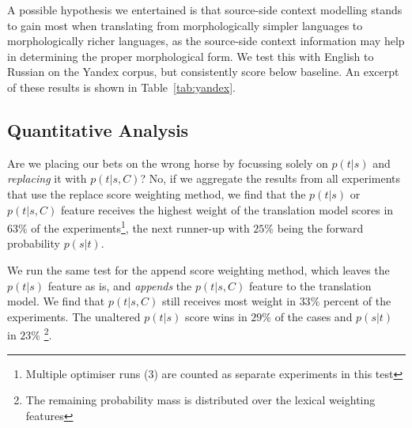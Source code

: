 A possible hypothesis we entertained is that source-side context modelling
stands to gain most when translating from morphologically simpler languages to
morphologically richer languages, as the source-side context information may
help in determining the proper morphological form. We test this with English to
Russian on the Yandex corpus, but consistently score below baseline. An excerpt
of these results is shown in Table~\ref{tab:yandex}.


\begin{table}
\noindent{}
\caption{An excerpt of the results on the Yandex corpus, English to Russian. No METEOR scores are available.} %
\label{tab:yandex}
\end{table}


\subsection{Quantitative Analysis}
\label{sec:quantanal}

Are we placing our bets on the wrong horse by focussing solely on $p(t|s)$ and
\emph{replacing} it with $p(t|s,C)$? No, if we aggregate the results from all
experiments that use the replace score weighting method, we find that the
$p(t|s)$ or $p(t|s,C)$ feature receives the highest weight of the translation
model scores in $63\%$ of the experiments\footnote{Multiple
optimiser runs (3) are counted as separate experiments in this test}, the next runner-up with $25\%$ being the forward probability
$p(s|t)$.

We run the same test for the append score weighting method, which leaves the $p(t|s)$ feature as is, and
\emph{appends} the $p(t|s,C)$ feature to the translation model.  We find that
$p(t|s,C)$ still receives most weight in $33\%$ percent of the experiments.
The unaltered $p(t|s)$ score wins in $29\%$ of the cases and $p(s|t)$ in
$23\%$ \footnote{The remaining probability mass is distributed over the lexical
weighting features}.

